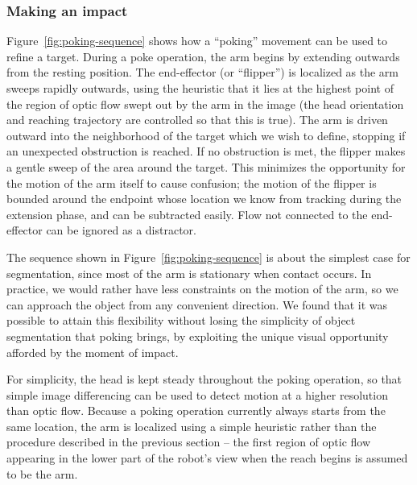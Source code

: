 \subsubsection*{Making an impact}

Figure~\ref{fig:poking-sequence} shows how a ``poking'' movement can
be used to refine a target.  During a poke operation, the arm begins
by extending outwards from the resting position.  The end-effector (or
``flipper'') is localized as the arm sweeps rapidly outwards, using
the heuristic that it lies at the highest point of the region of optic
flow swept out by the arm in the image (the head orientation and
reaching trajectory are controlled so that this is true).  The arm is
driven outward into the neighborhood of the target which we wish to
define, stopping if an unexpected obstruction is reached.  If no
obstruction is met, the flipper makes a gentle sweep of the area
around the target.  This minimizes the opportunity for the motion of
the arm itself to cause confusion; the motion of the flipper is
bounded around the endpoint whose location we know from tracking
during the extension phase, and can be subtracted easily.  Flow not
connected to the end-effector can be ignored as a distractor.


The sequence shown in Figure~\ref{fig:poking-sequence} is about the
simplest case for segmentation, since most of the arm is stationary
when contact occurs.  In practice, we would rather have less
constraints on the motion of the arm, so we can approach the object
from any convenient direction.  We found that it was possible 
to attain this flexibility without losing the simplicity of object
segmentation that poking brings, by exploiting the unique
visual opportunity afforded by the moment of impact.


\ifverbose
For simplicity, the head is kept steady throughout the poking
operation, so that simple image differencing can be used to detect
motion at a higher resolution than optic flow.  Because a poking
operation currently always starts from the same location, the arm
is localized using a simple heuristic rather than the procedure described
in the previous section -- the first region of optic flow appearing
in the lower part of the robot's view when the reach begins
is assumed to be the arm.
\fi

